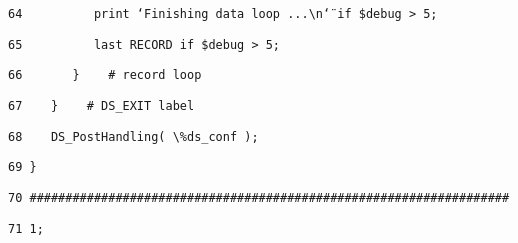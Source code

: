 \begin{table}[htbp]
\texttt{\scriptsize 64~~~~~~~~~ print \char`\"{}Finishing
data loop ...\textbackslash{}n\char`\"{} if \$debug > 5;}{\scriptsize \par}

\texttt{\scriptsize 65~~~~~~~~~ last RECORD if \$debug >
5;}{\scriptsize \par}

\texttt{\scriptsize 66~~~~~~ \}~~~ \# record loop}{\scriptsize \par}

\texttt{\scriptsize 67~~~ \}~~~ \# DS\_EXIT label}{\scriptsize \par}

\texttt{\scriptsize 68~~~ DS\_PostHandling( \textbackslash{}\%ds\_conf
);}{\scriptsize \par}

\texttt{\scriptsize 69 \}}{\scriptsize \par}

\texttt{\scriptsize 70 \#\#\#\#\#\#\#\#\#\#\#\#\#\#\#\#\#\#\#\#\#\#\#\#\#\#\#\#\#\#\#\#\#\#\#\#\#\#\#\#\#\#\#\#\#\#\#\#\#\#\#\#\#\#\#\#\#\#\#\#\#\#\#\#\#\#\#}{\scriptsize \par}

\texttt{\scriptsize 71 1;}
\end{table}


